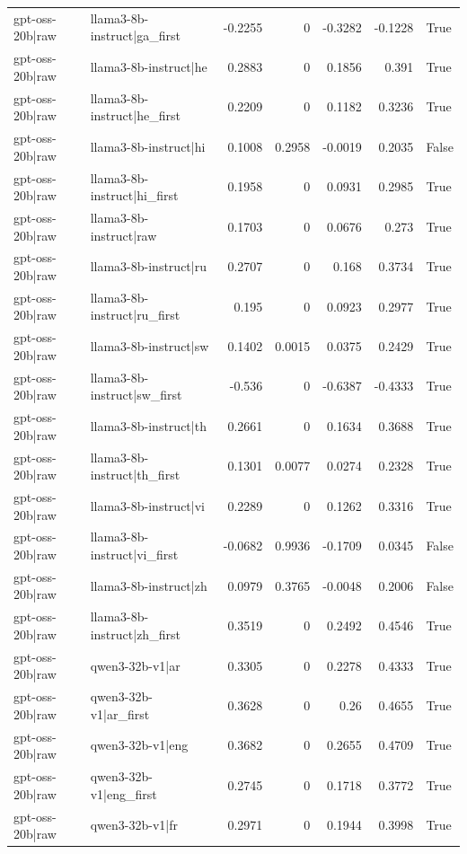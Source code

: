 \begin{table}
\begin{tabular}{l l r r r r l}
gpt-oss-20b|raw & llama3-8b-instruct|ga_first & -0.2255 & 0 & -0.3282 & -0.1228 & True \\
gpt-oss-20b|raw & llama3-8b-instruct|he & 0.2883 & 0 & 0.1856 & 0.391 & True \\
gpt-oss-20b|raw & llama3-8b-instruct|he_first & 0.2209 & 0 & 0.1182 & 0.3236 & True \\
gpt-oss-20b|raw & llama3-8b-instruct|hi & 0.1008 & 0.2958 & -0.0019 & 0.2035 & False \\
gpt-oss-20b|raw & llama3-8b-instruct|hi_first & 0.1958 & 0 & 0.0931 & 0.2985 & True \\
gpt-oss-20b|raw & llama3-8b-instruct|raw & 0.1703 & 0 & 0.0676 & 0.273 & True \\
gpt-oss-20b|raw & llama3-8b-instruct|ru & 0.2707 & 0 & 0.168 & 0.3734 & True \\
gpt-oss-20b|raw & llama3-8b-instruct|ru_first & 0.195 & 0 & 0.0923 & 0.2977 & True \\
gpt-oss-20b|raw & llama3-8b-instruct|sw & 0.1402 & 0.0015 & 0.0375 & 0.2429 & True \\
gpt-oss-20b|raw & llama3-8b-instruct|sw_first & -0.536 & 0 & -0.6387 & -0.4333 & True \\
gpt-oss-20b|raw & llama3-8b-instruct|th & 0.2661 & 0 & 0.1634 & 0.3688 & True \\
gpt-oss-20b|raw & llama3-8b-instruct|th_first & 0.1301 & 0.0077 & 0.0274 & 0.2328 & True \\
gpt-oss-20b|raw & llama3-8b-instruct|vi & 0.2289 & 0 & 0.1262 & 0.3316 & True \\
gpt-oss-20b|raw & llama3-8b-instruct|vi_first & -0.0682 & 0.9936 & -0.1709 & 0.0345 & False \\
gpt-oss-20b|raw & llama3-8b-instruct|zh & 0.0979 & 0.3765 & -0.0048 & 0.2006 & False \\
gpt-oss-20b|raw & llama3-8b-instruct|zh_first & 0.3519 & 0 & 0.2492 & 0.4546 & True \\
gpt-oss-20b|raw & qwen3-32b-v1|ar & 0.3305 & 0 & 0.2278 & 0.4333 & True \\
gpt-oss-20b|raw & qwen3-32b-v1|ar_first & 0.3628 & 0 & 0.26 & 0.4655 & True \\
gpt-oss-20b|raw & qwen3-32b-v1|eng & 0.3682 & 0 & 0.2655 & 0.4709 & True \\
gpt-oss-20b|raw & qwen3-32b-v1|eng_first & 0.2745 & 0 & 0.1718 & 0.3772 & True \\
gpt-oss-20b|raw & qwen3-32b-v1|fr & 0.2971 & 0 & 0.1944 & 0.3998 & True \\

\end{tabular}
\end{table}
